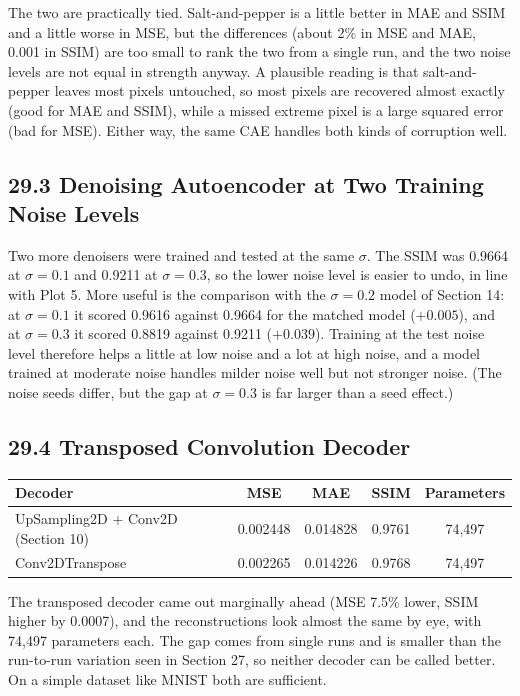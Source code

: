 \documentclass[10pt]{article}
\begin{document}
The two are practically tied. Salt-and-pepper is a little better in MAE and SSIM
and a little worse in MSE, but the differences (about 2\% in MSE and MAE, 0.001
in SSIM) are too small to rank the two from a single run, and the two noise
levels are not equal in strength anyway. A plausible reading is that
salt-and-pepper leaves most pixels untouched, so most pixels are recovered almost
exactly (good for MAE and SSIM), while a missed extreme pixel is a large squared
error (bad for MSE). Either way, the same CAE handles both kinds of corruption well.

\subsection*{29.3 Denoising Autoencoder at Two Training Noise Levels}

Two more denoisers were trained and tested at the same $\sigma$. The SSIM was
0.9664 at $\sigma=0.1$ and 0.9211 at $\sigma=0.3$, so the lower noise level is
easier to undo, in line with Plot 5. More useful is the comparison with the
$\sigma=0.2$ model of Section 14: at $\sigma=0.1$ it scored 0.9616 against 0.9664
for the matched model ($+0.005$), and at $\sigma=0.3$ it scored 0.8819 against
0.9211 ($+0.039$). Training at the test noise level therefore helps a little at
low noise and a lot at high noise, and a model trained at moderate noise handles
milder noise well but not stronger noise. (The noise seeds differ, but the gap at
$\sigma=0.3$ is far larger than a seed effect.)

\subsection*{29.4 Transposed Convolution Decoder}

\begin{center}
\begin{tabular}{|l|c|c|c|c|}
\hline
Decoder & MSE & MAE & SSIM & Parameters\\
\hline
UpSampling2D + Conv2D (Section 10) & 0.002448 & 0.014828 & 0.9761 & 74,497\\
Conv2DTranspose & 0.002265 & 0.014226 & 0.9768 & 74,497\\
\hline
\end{tabular}
\end{center}

The transposed decoder came out marginally ahead (MSE 7.5\% lower, SSIM higher by
0.0007), and the reconstructions look almost the same by eye, with 74,497 parameters each. The gap comes from single runs and is smaller than the
run-to-run variation seen in Section 27, so neither decoder can be called better.
On a simple dataset like MNIST both are sufficient.
\end{document}
